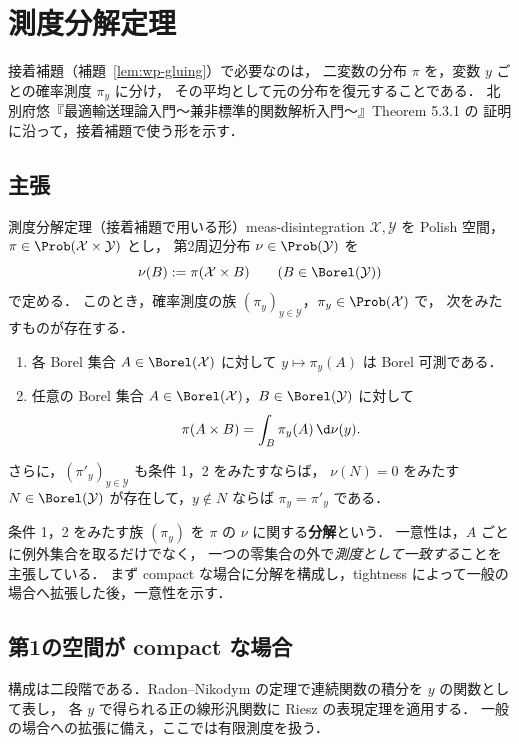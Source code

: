 \chapter{測度分解定理}
\label{ch:disintegration}

接着補題（補題~\ref{lem:wp-gluing}）で必要なのは，
二変数の分布 $\pi$ を，変数 $y$ ごとの確率測度 $\pi_y$ に分け，
その平均として元の分布を復元することである．
北別府悠『最適輸送理論入門〜兼非標準的関数解析入門〜』Theorem 5.3.1 の
証明に沿って，接着補題で使う形を示す．

\section{主張}

\begin{theorem}{測度分解定理（接着補題で用いる形）}{meas-disintegration}
  $\mathcal{X},\mathcal{Y}$ を Polish 空間，$\pi\in\Prob(\mathcal{X}\times\mathcal{Y})$ とし，
  第2周辺分布 $\nu\in\Prob(\mathcal{Y})$ を
  \[
    \nu(B):=\pi(\mathcal{X}\times B)\qquad(B\in\Borel(\mathcal{Y}))
  \]
  で定める．
  このとき，確率測度の族 $(\pi_y)_{y\in\mathcal{Y}}$，$\pi_y\in\Prob(\mathcal{X})$ で，
  次をみたすものが存在する．
  \begin{enumerate}
    \item 各 Borel 集合 $A\in\Borel(\mathcal{X})$ に対して $y\mapsto\pi_y(A)$ は Borel 可測である．
    \item 任意の Borel 集合 $A\in\Borel(\mathcal{X})$，$B\in\Borel(\mathcal{Y})$ に対して
      \[
        \pi(A\times B)=\int_B\pi_y(A)\,\d\nu(y).
      \]
  \end{enumerate}
  さらに，$(\pi'_y)_{y\in\mathcal{Y}}$ も条件 1，2 をみたすならば，
  $\nu(N)=0$ をみたす $N\in\Borel(\mathcal{Y})$ が存在して，$y\notin N$ ならば $\pi_y=\pi'_y$ である．
\end{theorem}

条件 1，2 をみたす族 $(\pi_y)$ を $\pi$ の $\nu$ に関する\textbf{分解}という．
一意性は，$A$ ごとに例外集合を取るだけでなく，
一つの零集合の外で\emph{測度として一致する}ことを主張している．
まず compact な場合に分解を構成し，tightness によって一般の場合へ拡張した後，一意性を示す．

\section{第1の空間が compact な場合}

構成は二段階である．Radon--Nikodym の定理で連続関数の積分を $y$ の関数として表し，
各 $y$ で得られる正の線形汎関数に Riesz の表現定理を適用する．
一般の場合への拡張に備え，ここでは有限測度を扱う．

